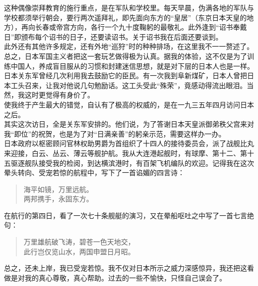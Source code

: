 这种偶像崇拜教育的施行重点，是在军队和学校里。每天早晨，伪满各地的军队与学校都须举行朝会，要行两次遥拜礼，即先面向东方的“皇居”（东京日本天皇的地方），再向长春或帝宫方向，各行一个九十度鞠躬的最敬礼。此外逢到“诏书奉戴日”即颁布每个诏书的日子，还要读诏书。关于诏书我在后面还要谈到。\\

此外还有其他许多规定，还有外地“巡狩”时的种种排场，在这里我不一一赘述了。总之，日本军国主义者把这一套玩艺做得极为认真。据我的体验，这不仅是为了训练中国人，养成盲目服从的习惯和封建迷信思想，就是对下层的日本人也是一样。日本关东军曾经几次利用我去鼓励它的臣民。有一次我到阜新煤矿，日本人曾把日本工头召来，让我对他说几句勉励话。这工头受此“殊荣”，竟感动得流出眼泪。当然，我这时更觉得有身价了。\\

使我终于产生最大的错觉，自认有了极高的权威的，是在一九三五年四月访问日本之后。\\

其实这次访日，全是关东军安排的。他们说，为了答谢日本天皇派御弟秩父宫来对我“即位”的祝贺，也是为了对“日满亲善”的躬亲示范，需要这样办一办。\\

日本政府以枢密顾问官林权助男爵为首组织了十四人的接待委员会，派了战舰比丸来迎接，白云、丛云、薄云等舰护航。我从大连港起舰时，有球摩、第十二、第十五驱逐舰队接受我的检阅，到达横滨港时，有百架飞机编队的欢迎。记得我在这次晕头转向、受宠若惊的航程中，写下了一首谄媚的四言诗：\\

\begin{quote}
	海平如镜，万里远航。\\

两邦携手，永固东方。\\

\end{quote}
在航行的第四日，看了一次七十条舰艇的演习，又在晕船呕吐之中写了一首七言绝句：\\

\begin{quote}
	万里雄航破飞涛，碧苍一色天地交，\\

此行岂仅览山水，两国申盟日月昭。\\
\end{quote}

总之，还未上岸，我已受宠若惊。我不仅对日本所示之威力深感惊异，我还把这看做是对我的真心尊敬，真心帮助。过去的一些不愉快，只怪自己误会了。\\

